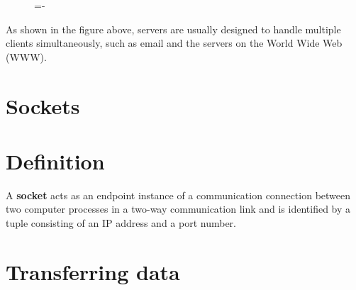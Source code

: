 \documentclass[a4paper]{systems-software}
\begin{document}
\begin{figure}[H]
	\lineskip=-\fboxrule
\end{figure}

As shown in the figure above, servers are usually designed to handle multiple clients simultaneously, such as email and the servers on the World Wide Web (WWW).


\section{Sockets}

\section*{Definition}

A \textbf{socket} acts as an endpoint instance of a communication connection between two computer processes in a two-way communication link and is identified by a tuple consisting of an IP address and a port number.


\section*{Transferring data}
\end{document}
